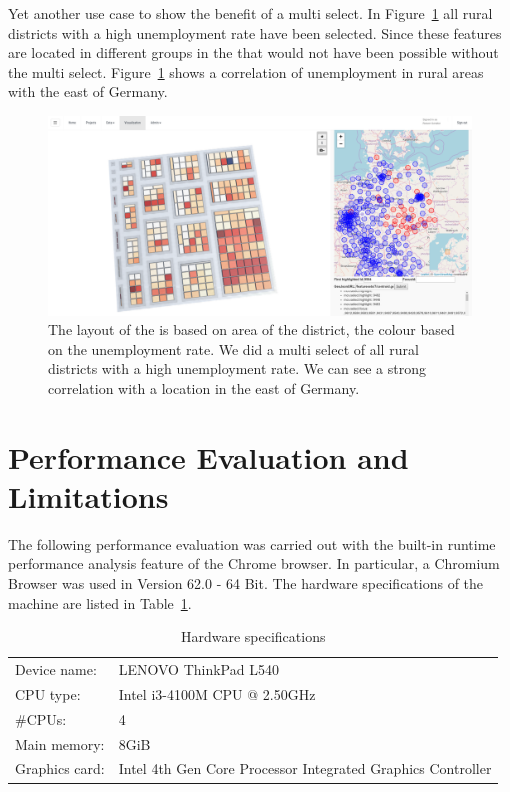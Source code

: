 Yet another use case to show the benefit of a multi select.
In Figure~\ref{fig:evaluation:cases:wahlkreise_multiselect:2} all rural districts with a high unemployment rate have been selected.
Since these features are located in different groups in the \tmap{} that would not have been possible without the multi select.
Figure~\ref{fig:evaluation:cases:wahlkreise_multiselect:2} shows a correlation of unemployment in rural areas with the east of Germany.

\begin{figure}[h]
  \centering
  \includegraphics[width=\textwidth]{figures/evaluation/cases/wahlkreise_multiselect_2}
  \caption{
    The layout of the \tmap{} is based on area of the district, the colour based on the unemployment rate.
    We did a multi select of all rural districts with a high unemployment rate.
    We can see a strong correlation with a location in the east of Germany.
  }\label{fig:evaluation:cases:wahlkreise_multiselect:2}
\end{figure}


\section{Performance Evaluation and Limitations}

The following performance evaluation was carried out with the built-in runtime performance analysis feature of the Chrome browser.
In particular, a Chromium Browser was used in Version 62.0 - 64 Bit.
The hardware specifications of the machine are listed in Table~\ref{tab:evaluation:performance:hardware}.

\begin{table}[ht]
  \centering
  \begin{tabular}{ll}
    Device name: & LENOVO ThinkPad L540 \\
    CPU type: & Intel i3-4100M CPU @ 2.50GHz \\
    \#CPUs: & 4 \\
    Main memory: & 8GiB \\
    Graphics card: & Intel 4th Gen Core Processor Integrated Graphics Controller \\
  \end{tabular}
  \caption{Hardware specifications}%
  \label{tab:evaluation:performance:hardware}
\end{table}

